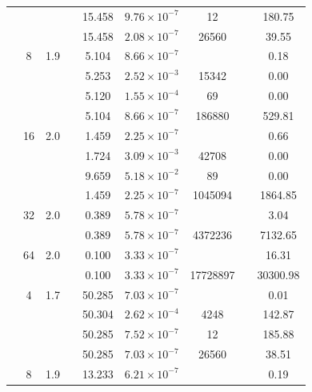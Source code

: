 \begin{table}[htbp]
\begin{tabular}{l S[table-format=3.0] S[table-format=4.1] l S[table-format=3.3] S[table-format=1.2e2] S[table-format=6.0] S[table-format=2.0] S[table-format=4.2]}
     &  &  &  & 15.458 & $9.76 \times 10^{-7}$ & 12 & {\text{---}} & 180.75 \\
     &  &  &  & 15.458 & $2.08 \times 10^{-7}$ & 26560 & {\text{---}} & 39.55 \\
     & 8 & 1.9 &  & 5.104 & $8.66 \times 10^{-7}$ & {\text{---}} & {\text{---}} & 0.18 \\
     &  &  &  & 5.253 & $2.52 \times 10^{-3}$ & 15342 & {\text{---}} & 0.00 \\
     &  &  &  & 5.120 & $1.55 \times 10^{-4}$ & 69 & {\text{---}} & 0.00 \\
     &  &  &  & 5.104 & $8.66 \times 10^{-7}$ & 186880 & {\text{---}} & 529.81 \\
     & 16 & 2.0 &  & 1.459 & $2.25 \times 10^{-7}$ & {\text{---}} & {\text{---}} & 0.66 \\
     &  &  &  & 1.724 & $3.09 \times 10^{-3}$ & 42708 & {\text{---}} & 0.00 \\
     &  &  &  & 9.659 & $5.18 \times 10^{-2}$ & 89 & {\text{---}} & 0.00 \\
     &  &  &  & 1.459 & $2.25 \times 10^{-7}$ & 1045094 & {\text{---}} & 1864.85 \\
     & 32 & 2.0 &  & 0.389 & $5.78 \times 10^{-7}$ & {\text{---}} & {\text{---}} & 3.04 \\
     &  &  &  & 0.389 & $5.78 \times 10^{-7}$ & 4372236 & {\text{---}} & 7132.65 \\
     & 64 & 2.0 &  & 0.100 & $3.33 \times 10^{-7}$ & {\text{---}} & {\text{---}} & 16.31 \\
     &  &  &  & 0.100 & $3.33 \times 10^{-7}$ & 17728897 & {\text{---}} & 30300.98 \\
    \midrule
     & 4 & 1.7 &  & 50.285 & $7.03 \times 10^{-7}$ & {\text{---}} & {\text{---}} & 0.01 \\
     &  &  &  & 50.304 & $2.62 \times 10^{-4}$ & 4248 & {\text{---}} & 142.87 \\
     &  &  &  & 50.285 & $7.52 \times 10^{-7}$ & 12 & {\text{---}} & 185.88 \\
     &  &  &  & 50.285 & $7.03 \times 10^{-7}$ & 26560 & {\text{---}} & 38.51 \\
     & 8 & 1.9 &  & 13.233 & $6.21 \times 10^{-7}$ & {\text{---}} & {\text{---}} & 0.19 \\

\end{tabular}
\end{table}
